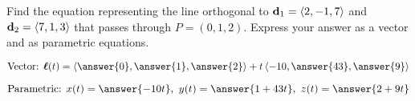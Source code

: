 \documentclass{ximera}
\author{Gregory Hartman \and Matthew Carr}
\begin{document}
\begin{exercise}



Find the equation representing the line orthogonal to $\mathbf{d}_{1}=\left\langle 2,-1,7\right\rangle$ and $\mathbf{d}_{2}=\left\langle 7,1,3\right\rangle$ that passes through $P=(0,1,2)$. Express your answer as a vector and as parametric equations.

\begin{prompt}
\[
\text{Vector:  } \vecl(t)=\vector{\answer{0},\answer{1},\answer{2}}+t\vector{-10,\answer{43},\answer{9}}
\]
\end{prompt}
\begin{prompt}
\[
\text{Parametric:  } x(t)=\answer{-10t},\ y(t)=\answer{1+43t},\ z(t)=\answer{2+9t}
\]
\end{prompt}


\end{exercise}
\end{document}
